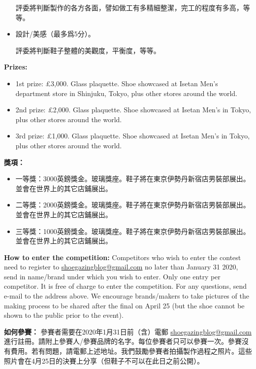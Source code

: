 \begin{paracol}{2}
\begin{itemize}
            評委將判斷製作的各方各面，譬如做工有多精細整潔，完工的程度有多高，等等。

            \item 設計/美感（最多爲5分）。

            評委將判斷鞋子整體的美觀度，平衡度，等等。
        \end{itemize}
        \switchcolumn*

        \textbf{Prizes:}
        \begin{itemize}
            \item 1st prize: £3,000. Glass plaquette. Shoe showcased at Isetan Men’s department store in Shinjuku, Tokyo, plus other stores around the world.
            \item 2nd prize: £2,000. Glass plaquette. Shoe showcased at Isetan Men’s in Tokyo, plus other stores around the world.
            \item 3rd prize: £1,000. Glass plaquette. Shoe showcased at Isetan Men’s in Tokyo, plus other stores around the world.
        \end{itemize}

        \vspace{1em}

        \switchcolumn
        \textbf{獎項：}
        \begin{itemize}
            \item 一等獎：3000英鎊獎金。玻璃獎座。鞋子將在東京伊勢丹新宿店男裝部展出。並會在世界上的其它店鋪展出。
            \item 二等獎：2000英鎊獎金。玻璃獎座。鞋子將在東京伊勢丹新宿店男裝部展出。並會在世界上的其它店鋪展出。
            \item 三等獎：1000英鎊獎金。玻璃獎座。鞋子將在東京伊勢丹新宿店男裝部展出。並會在世界上的其它店鋪展出。
        \end{itemize}
        \switchcolumn*

        \textbf{How to enter the competition:}
        Competitors who wish to enter the contest need to register to \href{mailto:shoegazingblog@gmail.com}{shoegazingblog@gmail.com} no later than January 31 2020, send in name/brand under which you wish to enter. Only one entry per competitor. It is free of charge to enter the competition. For any questions, send e-mail to the address above. We encourage brands/makers to take pictures of the making process to be shared after the final on April 25 (but the shoe cannot be shown to the public prior to the event).

        \switchcolumn
        \textbf{如何參賽：}
        參賽者需要在2020年1月31日前（含）電郵
        \href{mailto:shoegazingblog@gmail.com}{shoegazingblog@gmail.com}進行註冊。請附上參賽人/參賽品牌的名字。每位參賽者只可以參賽一次。參賽沒有費用。若有問題，請電郵上述地址。我們鼓勵參賽者拍攝製作過程之照片。這些照片會在4月25日的決賽上分享（但鞋子不可以在此日之前公開）。
        \switchcolumn*


\end{paracol}
